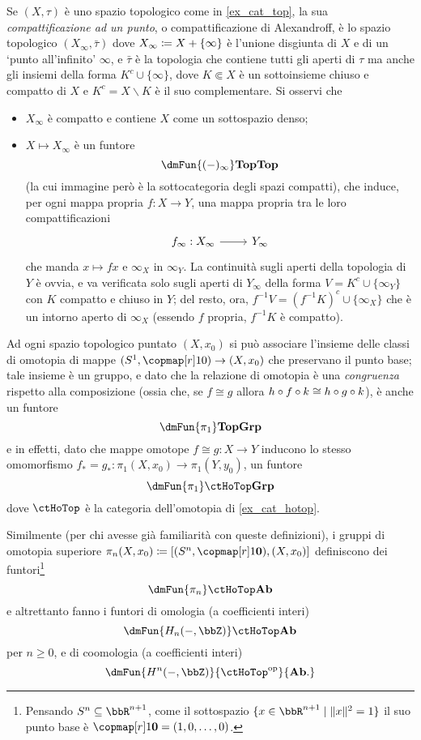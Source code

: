 \begin{example}
	Se $(X,\tau)$ è uno spazio topologico come in \ref{ex_cat_top}, la sua \emph{compattificazione ad un punto}, o compattificazione di Alexandroff, è lo spazio topologico $(X_\infty,\bar\tau)$ dove $X_\infty \coloneqq X + \{\infty\}$ è l'unione disgiunta di $X$ e di un `punto all'infinito' $\infty$, e $\bar\tau$ è la topologia che contiene tutti gli aperti di $\tau$ ma anche gli insiemi della forma $K^c \cup \{\infty\}$, dove $K\Subset X$ è un sottoinsieme chiuso e compatto di $X$ e $K^c = X\smallsetminus K$ è il suo complementare. Si osservi che 
	\begin{itemize}
		\item $X_\infty$ è compatto e contiene $X$ come un sottospazio denso;
		\item $X\mapsto  X_\infty$ è un funtore 
		\[\dmFun{(-)_\infty}\ctTop\ctTop\]
		(la cui immagine però è la sottocategoria degli spazi compatti), che induce, per ogni mappa propria $f : X\to Y$, una mappa propria tra le loro compattificazioni 
		\[\begin{tikzcd}
			f_\infty : X_\infty \ar[r] & Y_\infty
		\end{tikzcd}\]
		che manda $x\mapsto fx$ e $\infty_X$ in $\infty_Y$. La continuità sugli aperti della topologia di $Y$ è ovvia, e va verificata solo sugli aperti di $Y_\infty$ della forma $V=K^c\cup\{\infty_Y\}$ con $K$ compatto e chiuso in $Y$; del resto, ora, $f^{-1}V = (f^{-1}K)^c \cup \{\infty_X\}$ che è un intorno aperto di $\infty_X$ (essendo $f$ propria, $f^{-1}K$ è compatto).
	\end{itemize}
\end{example}
\begin{example}\label{fun_ex_omoto_omolo}
	Ad ogni spazio topologico puntato $(X,x_0)$ si può associare l'insieme delle classi di omotopia di mappe $(S^1, \copmap[r] 10)\to (X, x_0)$ che preservano il punto base; tale insieme è un gruppo, e dato che la relazione di omotopia è una \emph{congruenza} rispetto alla composizione (ossia che, se $f\cong g$ allora $h\circ f\circ k\cong h\circ g\circ k$), è anche un funtore
	\[\dmFun{\pi_1}\ctTop\ctGrp\]
	e in effetti, dato che mappe omotope $f\cong g : X\to Y$ inducono lo stesso omomorfismo $f_* = g_* : \pi_1(X,x_0) \to \pi_1(Y,y_0)$, un funtore 
	\[\dmFun{\pi_1}\ctHoTop\ctGrp\]
	dove $\ctHoTop$ è la categoria dell'omotopia di \ref{ex_cat_hotop}.

	Similmente (per chi avesse già familiarità con queste definizioni), i gruppi di omotopia superiore $\pi_n(X,x_0) \defeq [(S^n,\copmap[r] 1{\mathbf{0}}), (X,x_0)]$ definiscono dei funtori\footnote{Pensando $S^n\subseteq\bbR^{n+1}$, come il sottospazio $\{x\in\bbR^{n+1}\mid \|x\|^2=1\}$ il suo punto base è $\copmap[r]1{\mathbf 0}=(1,0,\dots,0)$.} 
	\[\dmFun{\pi_n}\ctHoTop\ctAb\]
	e altrettanto fanno i funtori di omologia (a coefficienti interi)
	\[\dmFun{H_n(-,\bbZ)}\ctHoTop\ctAb\]
	per $n\ge 0$, e di coomologia (a coefficienti interi) 
	\[\dmFun{H^n(-,\bbZ)}{\ctHoTop^\op}{\ctAb.}\]
\end{example}
